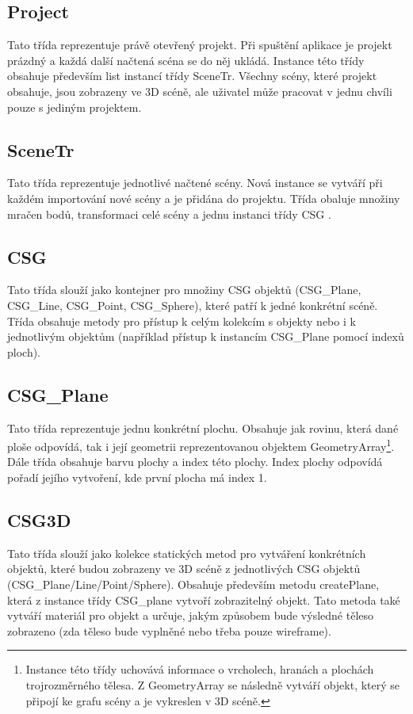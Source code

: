 \documentclass[11pt,twoside,a4paper]{book}
\begin{document}
\subsection{Project}
Tato třída reprezentuje právě otevřený projekt. Při spuštění aplikace je projekt prázdný a každá další načtená scéna se do něj ukládá. Instance této třídy obsahuje především list instancí třídy SceneTr. Všechny scény, které projekt obsahuje, jsou zobrazeny ve 3D scéně, ale uživatel může pracovat v jednu chvíli pouze s jediným projektem.

\subsection{SceneTr}
Tato třída reprezentuje jednotlivé načtené scény. Nová instance se vytváří při každém importování nové scény a je přidána do projektu. Třída obaluje množiny mračen bodů, transformaci celé scény a jednu instanci třídy CSG .

\subsection{CSG}
Tato třída slouží jako kontejner pro množiny CSG objektů (CSG\_Plane, CSG\_Line, CSG\_Point, CSG\_Sphere), které patří k jedné konkrétní scéně. Třída obsahuje metody pro přístup k celým kolekcím s objekty nebo i k jednotlivým objektům (například přístup k instancím CSG\_Plane pomocí indexů ploch).

\subsection{CSG\_Plane}
Tato třída reprezentuje jednu konkrétní plochu. Obsahuje jak rovinu, která dané ploše odpovídá, tak i její geometrii reprezentovanou objektem GeometryArray\footnote{Instance této třídy uchovává informace o vrcholech, hranách a plochách trojrozměrného tělesa. Z GeometryArray se následně vytváří objekt, který se připojí ke grafu scény a je vykreslen v 3D scéně.}\cite{Java3DDoc}. Dále třída obsahuje barvu plochy a index této plochy. Index plochy odpovídá pořadí jejího vytvoření, kde první plocha má index 1.

\subsection{CSG3D}
Tato třída slouží jako kolekce statických metod pro vytváření konkrétních objektů, které budou zobrazeny ve 3D scéně z jednotlivých CSG objektů (CSG\_Plane/Line/Point/Sphere). Obsahuje především metodu createPlane, která z instance třídy CSG\_plane vytvoří zobrazitelný objekt. Tato metoda také vytváří materiál pro objekt a určuje, jakým způsobem bude výsledné těleso zobrazeno (zda těleso bude vyplněné nebo třeba pouze wireframe).
\end{document}
